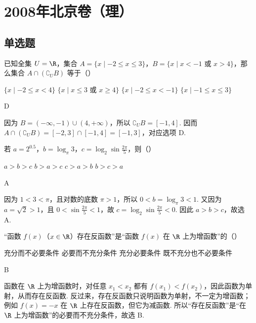 \chapter{2008年北京卷（理）}

\section{单选题}

\begin{problem}
已知全集 \(U = \R\)，集合 \(A = \{x \mid -2 \leqslant x \leqslant 3\}\)，\(B = \{x \mid x < -1\text{\ 或\ }x > 4\}\)，那么集合 \(A \cap (\complement_U B)\) 等于（\quad）

\choices
    {\(\{x\mid -2\leqslant x < 4\}\)}
    {\(\{x\mid x\leqslant 3\text{\ 或\ }x\geqslant 4\}\)}
    {\(\{x\mid -2\leqslant x < -1\}\)}
    {\(\{x\mid -1\leqslant x\leqslant 3\}\)}

\begin{answer}
D
\end{answer}

\begin{solution}
因为 \(B=(-\infty,-1)\cup(4,+\infty)\)，所以 \(\complement_U B=[-1,4]\). 因而 \(A\cap(\complement_U B)=[-2,3]\cap[-1,4]=[-1,3]\)，对应选项 D.
\end{solution}
\end{problem}

\begin{problem}
若 \(a = 2^{0.5}\)，\(b = \log_{\pi} 3\)，\(c = \log_2 \sin \frac{2\pi}{5}\)，则（\quad）

\choices
    {\(a > b > c\)}
    {\(b > a > c\)}
    {\(c > a > b\)}
    {\(b > c > a\)}

\begin{answer}
A
\end{answer}

\begin{solution}
因为 \(1<3<\pi\)，且对数的底数 \(\pi>1\)，所以 \(0<b=\log_{\pi}3<1\). 又因为 \(a=\sqrt{2}>1\)，且 \(0<\sin\frac{2\pi}{5}<1\)，故 \(c=\log_2\sin\frac{2\pi}{5}<0\). 因此 \(a>b>c\)，故选 A.
\end{solution}
\end{problem}

\begin{problem}
“函数 \( f(x) \)（\(x \in \R\)）存在反函数”是“函数 \( f(x) \) 在 \(\R\) 上为增函数”的（\quad）

\choices
    {充分而不必要条件}
    {必要而不充分条件}
    {充分必要条件}
    {既不充分也不必要条件}

\begin{answer}
B
\end{answer}

\begin{solution}
函数在 \(\R\) 上为增函数时，对任意 \(x_1<x_2\) 都有 \(f(x_1)<f(x_2)\)，因此函数为单射，从而存在反函数. 反过来，存在反函数只说明函数为单射，不一定为增函数；例如 \(f(x)=-x\) 在 \(\R\) 上存在反函数，但它为减函数. 所以“存在反函数”是“在 \(\R\) 上为增函数”的必要而不充分条件，故选 B.
\end{solution}
\end{problem}

